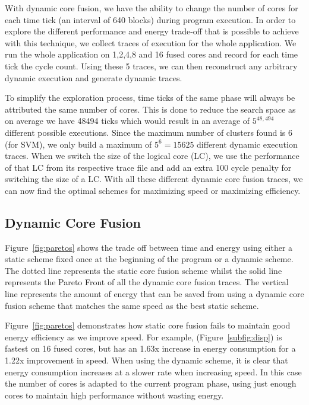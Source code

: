 With dynamic core fusion, we have the ability to change the number of cores for each time tick (an interval of 640 blocks) during program execution.
In order to explore the different performance and energy trade-off that is possible to achieve with this technique, we collect traces of execution for the whole application.
We run the whole application on 1,2,4,8 and 16 fused cores and record for each time tick the cycle count.
Using these 5 traces, we can then reconstruct any arbitrary dynamic execution and generate dynamic traces.

To simplify the exploration process, time ticks of the same phase will always be attributed the same number of cores.
This is done to reduce the search space as on average we have 48494 ticks which would result in an average of $5^{48,494}$ different possible executions.
Since the maximum number of clusters found is 6 (for SVM), we only build a maximum of $5^{6} = 15625$ different dynamic execution traces.
When we switch the size of the logical core (LC), we use the performance of that LC from its respective trace file and add an extra 100 cycle penalty for switching the size of a LC.
With all these different dynamic core fusion traces, we can now find the optimal schemes for maximizing speed or maximizing efficiency.

\subsection{Dynamic Core Fusion}
Figure~\ref{fig:paretos} shows the trade off between time and energy using either a static scheme fixed once at the beginning of the program or a dynamic scheme.
The dotted line represents the static core fusion scheme whilst the solid line represents the Pareto Front of all the dynamic core fusion traces.
The vertical line represents the amount of energy that can be saved from using a dynamic core fusion scheme that matches the same speed as the best static scheme.

Figure~\ref{fig:paretos} demonstrates how static core fusion fails to maintain good energy efficiency as we improve speed.
For example,  (Figure~\ref{subfig:disp}) is fastest on 16 fused cores, but has an 1.63x increase in energy consumption for a 1.22x improvement in speed.
When using the dynamic scheme, it is clear that energy consumption increases at a slower rate when increasing speed.
In this case the number of cores is adapted to the current program phase, using just enough cores to maintain high performance without wasting energy.


